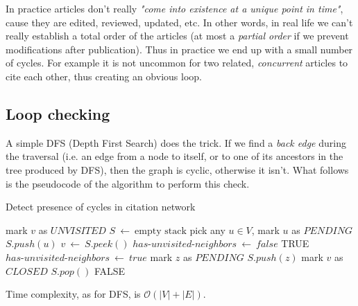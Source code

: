In practice articles don't really \textit{"come into existence at a unique point in time"}, cause they are edited, reviewed, updated, etc.
In other words, in real life we can't really establish a total order of
the articles (at most a \textit{partial order} if we prevent modifications
after publication). Thus in practice we end up with a small number of
cycles. For example it is not uncommon for two
related, \textit{concurrent} articles to cite each other, thus creating an
obvious loop.

\subsection{Loop checking}

A simple DFS (Depth First Search) does the trick. If we find a
\textit{back edge} during the traversal (i.e. an edge from a node to
itself, or to one of its ancestors in the tree produced by DFS), then
the graph is cyclic, otherwise it isn't. What follows is the pseudocode 
of the algorithm to perform this check.
\newpage
\begin{algorithm}
	\caption{Detect presence of cycles in citation network}
	\begin{algorithmic}[1]
			\State mark $v$ as $UNVISITED$
		\EndFor
		\State $S \ \leftarrow \ \text{empty stack}$
		\State pick any $u \in V$, mark $u$ as $PENDING$
		\State $S.push(u)$
			\State $v \ \leftarrow \ S.peek()$
			\State $has\text{-}unvisited\text{-}neighbors \ \leftarrow \ false$
					\State \Return TRUE
					\State $has\text{-}unvisited\text{-}neighbors \ \leftarrow \ true$
					\State mark $z$ as $PENDING$
					\State $S.push(z)$
				\EndIf
			\EndFor
				\State mark $v$ as $CLOSED$
				\State $S.pop()$
			\EndIf
		\EndWhile
		\State \Return FALSE
	\end{algorithmic}
\end{algorithm}
\medskip

\noindent Time complexity, as for DFS, is $\mathcal{O}(|V|+|E|)$.
